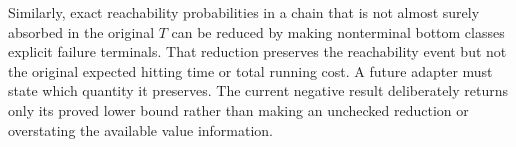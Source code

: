 Similarly, exact reachability probabilities in a chain that is not almost
surely absorbed in the original $T$ can be reduced by making nonterminal bottom
classes explicit failure terminals. That reduction preserves the reachability
event but not the original expected hitting time or total running cost. A
future adapter must state which quantity it preserves. The current negative
result deliberately returns only its proved lower bound rather than making an
unchecked reduction or overstating the available value information.
